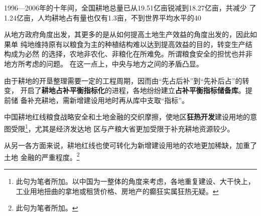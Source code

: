 1996—2006年的十年间，全国耕地总量已从19.51亿亩锐减到18.27亿亩，共减少
了1.24亿亩，人均耕地占有量也仅有1.3亩，不到世界平均水平的40%

从地方政府角度出发，其更多的是从如何提高土地生产效益的角度出发的，因此如果单
纯地维持原有以粮食为主的种植结构难以达到提高效益的目的，转变生产结构成为必然
的选择，农地非农化、非粮化在所难免。所谓粮食安全的担忧也并非地方所考虑的问题。
在这一点上，中央与地方之间的矛盾凸显。

由于耕地的开垦整理需要一定的工程周期，因而由“先占后补”到“先补后占”的转变，
开启了\textbf{耕地占补平衡指标化}的进程，各地纷纷建立\textbf{占补平衡指标储备库}。提前储
备补充耕地，需新增建设用地时再从库中支取“指标”。

中国耕地红线粮食战略安全和土地金融的交织摩擦，使地区\textbf{狂热开发}建设用地的意
图受限\footnote{此句为笔者所加。以中国为一整体的角度来考虑，各地重复建设、大干快上，
工业用地扭曲的拿地或租赁价格、房地产的癫狂实属狂热无疑。}，尤其是经济发达地
区与产粮大省更加受限于补充耕地资源较少。

从另一各方面来说，耕地红线也使可转化为新增建设用地的农地更加稀缺，加重了土地
金融的严重程度。\footnote{此句为笔者所加。}
